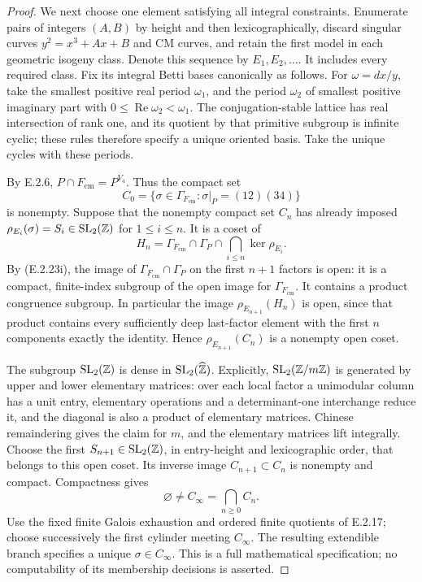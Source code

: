 \begin{proof}
We next choose one element satisfying all integral constraints.
Enumerate pairs of integers \((A,B)\) by height and then
lexicographically, discard singular curves
\(y^2=x^3+Ax+B\) and CM curves, and retain the first model
in each geometric isogeny class. Denote this sequence by
\(E_1,E_2,\ldots\). It includes every required class.
Fix its integral Betti bases canonically as follows. For
\(\omega=dx/y\), take the smallest positive real period
\(\omega_1\), and the period \(\omega_2\) of smallest
positive imaginary part with
\(0\leq\operatorname{Re}\omega_2<\omega_1\).
The conjugation-stable lattice has real intersection of
rank one, and its quotient by that primitive subgroup is
infinite cyclic; these rules therefore specify a unique
oriented basis. Take the unique cycles with these periods.

By E.2.6, \(P\cap F_{\mathrm{cm}}=P^{V_4}\).
Thus the compact set
\[
 C_0=\{\sigma\in\Gamma_{F_{\mathrm{cm}}}:
                    \sigma|_P=(12)(34)\}
\]
is nonempty. Suppose that the nonempty compact set \(C_n\)
has already imposed
\(\rho_{E_i}(\sigma)=S_i\in\operatorname{SL}_2(\mathbb Z)\)
for \(1\leq i\leq n\). It is a coset of
\[
 H_n=\Gamma_{F_{\mathrm{cm}}}\cap\Gamma_P
                      \cap\bigcap_{i\leq n}\ker\rho_{E_i}.
 \tag{E.2.23j}
\]
By (E.2.23i), the image of
\(\Gamma_{F_{\mathrm{cm}}}\cap\Gamma_P\) on the first
\(n+1\) factors is open: it is a compact, finite-index
subgroup of the open image for \(\Gamma_{F_{\mathrm{cm}}}\).
It contains a product congruence subgroup. In particular the
image \(\rho_{E_{n+1}}(H_n)\) is open, since that product
contains every sufficiently deep last-factor element with
the first \(n\) components exactly the identity.
Hence \(\rho_{E_{n+1}}(C_n)\) is a nonempty open coset.

The subgroup \(\operatorname{SL}_2(\mathbb Z)\) is dense in
\(\operatorname{SL}_2(\widehat{\mathbb Z})\). Explicitly,
\(\operatorname{SL}_2(\mathbb Z/m\mathbb Z)\) is generated by upper
and lower elementary matrices: over each local factor a
unimodular column has a unit entry, elementary operations
and a determinant-one interchange reduce it, and the
diagonal is also a product of elementary matrices.
Chinese remaindering gives the claim for \(m\), and the
elementary matrices lift integrally. Choose the first
\(S_{n+1}\in\operatorname{SL}_2(\mathbb Z)\), in entry-height
and lexicographic order, that belongs to this open coset.
Its inverse image \(C_{n+1}\subset C_n\) is nonempty
and compact. Compactness gives
\[
 \varnothing\ne C_\infty=\bigcap_{n\geq0}C_n.
 \tag{E.2.23k}
\]
Use the fixed finite Galois exhaustion and ordered finite
quotients of E.2.17; choose successively the first cylinder
meeting \(C_\infty\). The resulting extendible branch
specifies a unique \(\sigma\in C_\infty\).
This is a full mathematical specification; no computability
of its membership decisions is asserted.


\end{proof}
